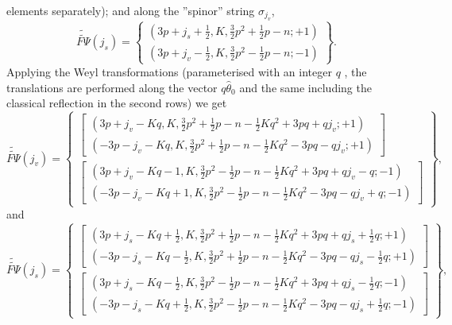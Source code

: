 \documentclass{article}
\begin{document}
elements separately); and along the ''spinor'' string $\sigma _{j_{v}}$, 
\begin{equation*}
\widetilde{\widetilde{F\Psi }}\left( j_{s}\right) =\left\{ 
\begin{array}{c}
\left( 3p+j_{s}+\frac{1}{2},K,\frac{3}{2}p^{2}+\frac{1}{2}p-n;+1\right) \\ 
\left( 3p+j_{v}-\frac{1}{2},K,\frac{3}{2}p^{2}-\frac{1}{2}p-n;-1\right)
\end{array}
\right\} .
\end{equation*}
Applying the Weyl transformations (parameterised with an integer $q$ , the
translations are performed along the vector $q\widehat{\theta }_{0}$ and the
same including the classical reflection in the second rows) we get 
\begin{equation*}
\widetilde{\widetilde{F\Psi }}\left( j_{v}\right) =\left\{ 
\begin{array}{c}
\left[ 
\begin{array}{c}
\left( 3p+j_{v}-Kq,K,\frac{3}{2}p^{2}+\frac{1}{2}p-n-\frac{1}{2}%
Kq^{2}+3pq+qj_{v};+1\right) \\ 
\left( -3p-j_{v}-Kq,K,\frac{3}{2}p^{2}+\frac{1}{2}p-n-\frac{1}{2}%
Kq^{2}-3pq-qj_{v};+1\right)
\end{array}
\right] \\ 
\left[ 
\begin{array}{c}
\left( 3p+j_{v}-Kq-1,K,\frac{3}{2}p^{2}-\frac{1}{2}p-n-\frac{1}{2}%
Kq^{2}+3pq+qj_{v}-q;-1\right) \\ 
\left( -3p-j_{v}-Kq+1,K,\frac{3}{2}p^{2}-\frac{1}{2}p-n-\frac{1}{2}%
Kq^{2}-3pq-qj_{v}+q;-1\right)
\end{array}
\right]
\end{array}
\right\} ,
\end{equation*}
and 
\begin{equation*}
\widetilde{\widetilde{F\Psi }}\left( j_{s}\right) =\left\{ 
\begin{array}{c}
\left[ 
\begin{array}{c}
\left( 3p+j_{s}-Kq+\frac{1}{2},K,\frac{3}{2}p^{2}+\frac{1}{2}p-n-\frac{1}{2}%
Kq^{2}+3pq+qj_{s}+\frac{1}{2}q;+1\right) \\ 
\left( -3p-j_{s}-Kq-\frac{1}{2},K,\frac{3}{2}p^{2}+\frac{1}{2}p-n-\frac{1}{2}%
Kq^{2}-3pq-qj_{s}-\frac{1}{2}q;+1\right)
\end{array}
\right] \\ 
\left[ 
\begin{array}{c}
\left( 3p+j_{s}-Kq-\frac{1}{2},K,\frac{3}{2}p^{2}-\frac{1}{2}p-n-\frac{1}{2}%
Kq^{2}+3pq+qj_{s}-\frac{1}{2}q;-1\right) \\ 
\left( -3p-j_{s}-Kq+\frac{1}{2},K,\frac{3}{2}p^{2}-\frac{1}{2}p-n-\frac{1}{2}%
Kq^{2}-3pq-qj_{s}+\frac{1}{2}q;-1\right)
\end{array}
\right]
\end{array}
\right\} ,
\end{equation*}
\end{document}
